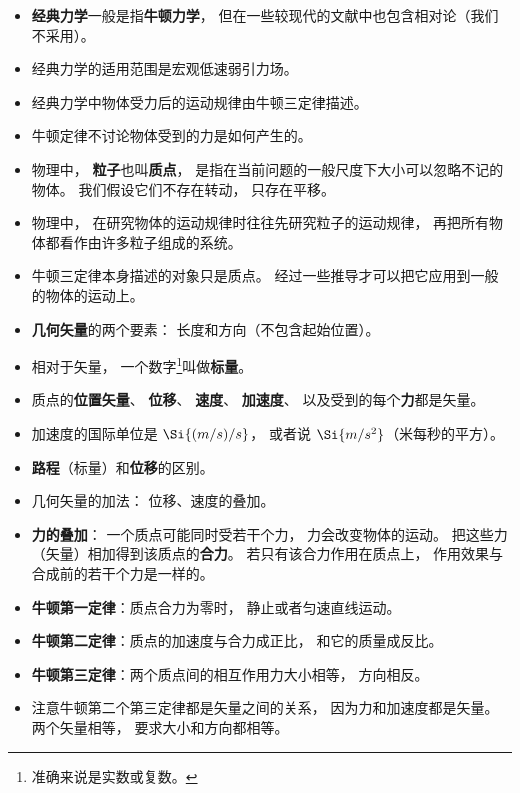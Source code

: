 
\begin{issues}
\issueDraft
\end{issues}

\begin{itemize}
\item \textbf{经典力学}一般是指\textbf{牛顿力学}， 但在一些较现代的文献中也包含相对论（我们不采用）。
\item 经典力学的适用范围是宏观低速弱引力场。
\item 经典力学中物体受力后的运动规律由牛顿三定律描述。
\item 牛顿定律不讨论物体受到的力是如何产生的。
\item 物理中， \textbf{粒子}也叫\textbf{质点}， 是指在当前问题的一般尺度下大小可以忽略不记的物体。 我们假设它们不存在转动， 只存在平移。
\item 物理中， 在研究物体的运动规律时往往先研究粒子的运动规律， 再把所有物体都看作由许多粒子组成的系统。
\item 牛顿三定律本身描述的对象只是质点。 经过一些推导才可以把它应用到一般的物体的运动上。
\item \textbf{几何矢量}的两个要素： 长度和方向（不包含起始位置）。
\item 相对于矢量， 一个数字\footnote{准确来说是实数或复数。}叫做\textbf{标量}。
\item 质点的\textbf{位置矢量}、 \textbf{位移}、 \textbf{速度}、 \textbf{加速度}、 以及受到的每个\textbf{力}都是矢量。
\item 加速度的国际单位是 $\Si{(m/s)/s}$， 或者说 $\Si{m/s^2}$（米每秒的平方）。
\item \textbf{路程}（标量）和\textbf{位移}的区别。
\item 几何矢量的加法： 位移、速度的叠加。
\item \textbf{力的叠加}： 一个质点可能同时受若干个力， 力会改变物体的运动。 把这些力（矢量）相加得到该质点的\textbf{合力}。 若只有该合力作用在质点上， 作用效果与合成前的若干个力是一样的。
\item \textbf{牛顿第一定律}：质点合力为零时， 静止或者匀速直线运动。
\item \textbf{牛顿第二定律}：质点的加速度与合力成正比， 和它的质量成反比。
\item \textbf{牛顿第三定律}：两个质点间的相互作用力大小相等， 方向相反。
\item 注意牛顿第二个第三定律都是矢量之间的关系， 因为力和加速度都是矢量。 两个矢量相等， 要求大小和方向都相等。
\end{itemize}
